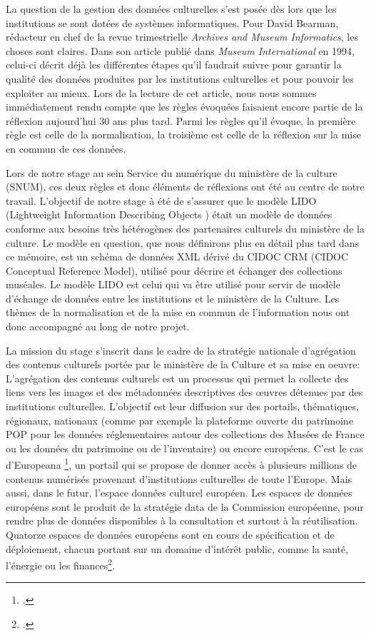 La question de la gestion des données culturelles s’est posée dès lors que les institutions se sont dotées de systèmes informatiques. Pour David Bearman, rédacteur en chef de la revue trimestrielle \textit{Archives and Museum Informatics}, les choses sont claires. Dans son article publié dans \textit{Museum International} en 1994, celui-ci décrit déjà les différentes étapes qu’il faudrait suivre pour garantir la qualité des données produites par les institutions culturelles et pour pouvoir les exploiter au mieux. Lors de la lecture de cet article, nous nous sommes immédiatement rendu compte que les règles évoquées faisaient encore partie de la réflexion aujourd'hui 30 ans plus tard. Parmi les règles qu’il évoque, la première règle est celle de la normalisation, la troisième est celle de la réflexion sur la mise en commun de ces données. \newline

Lors de notre stage au sein Service du numérique du ministère de la culture (SNUM), ces deux règles et donc éléments de réflexions ont été au centre de notre travail. 
L’objectif de notre stage à été de s’assurer que le modèle LIDO (Lightweight Information Describing Objects ) était un modèle de données conforme aux besoins très hétérogènes des partenaires culturels du ministère de la culture. Le modèle en question, que nous définirons plus en détail plus tard dans ce mémoire, est un schéma de données XML dérivé du CIDOC CRM (CIDOC Conceptual Reference Model), utilisé pour décrire et échanger  des collections muséales. Le modèle LIDO est celui qui va être utilisé pour servir de modèle d'échange de données entre les institutions et le ministère de la Culture. Les thèmes de la normalisation et de la mise en commun de l’information nous ont donc accompagné au long de notre projet. \newline

La mission du stage s’inscrit dans le cadre de la stratégie nationale d’agrégation des contenus culturels portée par le ministère de la Culture et sa mise en oeuvre:
L’agrégation des contenus culturels est un processus qui permet la collecte des liens vers les images et des métadonnées descriptives des œuvres détenues par des institutions culturelles. L’objectif est leur diffusion sur des portails, thématiques, régionaux, nationaux (comme par exemple la plateforme ouverte du patrimoine POP pour les données réglementaires autour des collections des Musées de France ou les données du patrimoine ou de l’inventaire) ou encore européens. C’est le cas d’Europeana \footcite{europeana}, un portail qui se propose de donner accès à plusieurs millions de contenus numérisés provenant d’institutions culturelles de toute l’Europe. Mais aussi, dans le futur, l’espace données culturel européen. Les espaces de données européens sont le produit de la stratégie data de la Commission européenne, pour rendre plus de données disponibles à la consultation et surtout à la réutilisation. Quatorze espaces de données européens sont en cours de spécification et de déploiement, chacun portant sur un domaine d'intérêt public, comme la santé, l’énergie ou les finances\footcite{eecd}.\newline

